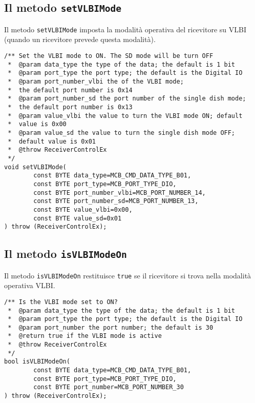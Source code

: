 \subsection{Il metodo \texttt{setVLBIMode}}
Il metodo \texttt{setVLBIMode} imposta la modalit\`a operativa del ricevitore su 
VLBI (quando
un ricevitore prevede questa modalit\`a).
\lstset{language=C++}
\begin{lstlisting}[caption={Dichiarazione del metodo \texttt{setVLBIMode}},
label=lst:setVLBIMode,mathescape]
/** Set the VLBI mode to ON. The SD mode will be turn OFF
 *  @param data_type the type of the data; the default is 1 bit
 *  @param port_type the port type; the default is the Digital IO
 *  @param port_number_vlbi the of the VLBI mode; 
 *  the default port number is 0x14
 *  @param port_number_sd the port number of the single dish mode; 
 *  the default port number is 0x13
 *  @param value_vlbi the value to turn the VLBI mode ON; default
 *  value is 0x00
 *  @param value_sd the value to turn the single dish mode OFF; 
 *  default value is 0x01
 *  @throw ReceiverControlEx
 */
void setVLBIMode(
        const BYTE data_type=MCB_CMD_DATA_TYPE_B01,
        const BYTE port_type=MCB_PORT_TYPE_DIO,
        const BYTE port_number_vlbi=MCB_PORT_NUMBER_14,
        const BYTE port_number_sd=MCB_PORT_NUMBER_13,
        const BYTE value_vlbi=0x00,
        const BYTE value_sd=0x01
) throw (ReceiverControlEx);
\end{lstlisting}
\lstset{numbers=none}


\subsection{Il metodo \texttt{isVLBIModeOn}}
Il metodo \texttt{isVLBIModeOn} restituisce \texttt{true} se il ricevitore
si trova nella modalit\`a operativa VLBI.
\lstset{language=C++}
\begin{lstlisting}[caption={Dichiarazione del metodo \texttt{isVLBIModeOn}},
label=lst:isVLBIModeOn,mathescape]
/** Is the VLBI mode set to ON?
 *  @param data_type the type of the data; the default is 1 bit
 *  @param port_type the port type; the default is the Digital IO
 *  @param port_number the port number; the default is 30
 *  @return true if the VLBI mode is active
 *  @throw ReceiverControlEx
 */
bool isVLBIModeOn(
        const BYTE data_type=MCB_CMD_DATA_TYPE_B01,
        const BYTE port_type=MCB_PORT_TYPE_DIO,
        const BYTE port_number=MCB_PORT_NUMBER_30
) throw (ReceiverControlEx);
\end{lstlisting}
\lstset{numbers=none}



